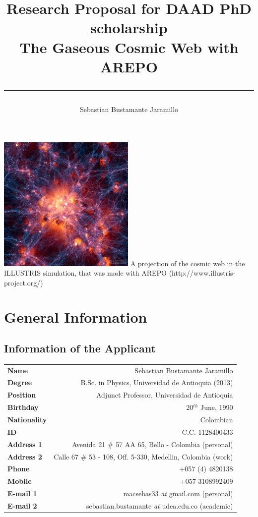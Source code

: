 \documentclass[a4,useAMS,usenatbib,usegraphicx,12pt]{article}
\title{{\textbf{Research Proposal for DAAD PhD scholarship}}\\ The Gaseous Cosmic Web with AREPO\\ \color{black}\rule{15cm}{0.5mm}}
\author{Sebastian Bustamante Jaramillo}
\date{}
\begin{document}
\maketitle
\begin{center}
\includegraphics[trim = 0mm 3.5cm 0mm 3.0cm, clip, keepaspectratio=true,
width=0.7\textheight]{Presentation1.png}
\tiny{A projection of the cosmic web in the ILLUSTRIS simulation, that was made 
with AREPO (http://www.illustris-project.org/)}
\end{center}
\tableofcontents
 
\newpage 

\section{General Information}
\small
\subsection*{Information of the Applicant}
\begin{tabular}{L!{\VRule}R}
\bf Name		& Sebastian Bustamante Jaramillo\\
\bf Degree		& B.Sc. in Physics, Universidad de Antioquia (2013)\\
\bf Position	& Adjunct Professor, Universidad de Antioquia\\
\bf Birthday	& { 20$^{th}$ June, 1990}\\
\bf Nationality & Colombian\\
\bf ID			& C.C. 1128400433\\
\bf Address 1	& Avenida 21 \# 57 AA 65, Bello - Colombia (personal)\\
\bf Address 2	& Calle 67 \# 53 - 108, Off. 5-330, Medellin, Colombia (work)\\
\bf Phone		& +057 (4) 4820138\\
\bf Mobile		& +057 3108992409\\
\bf E-mail 1	& macsebas33 \textit{at} gmail.com (personal)\\
\bf E-mail 2	& sebastian.bustamante \textit{at} udea.edu.co (academic)\\
\end{tabular}
\end{document}
